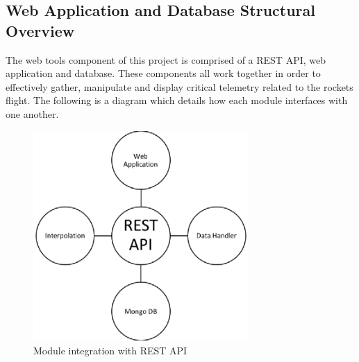 \documentclass[onecolumn, draftclsnofoot,10pt, compsoc]{IEEEtran}
\begin{document}
\subsection{Web Application and Database Structural Overview}
The web tools component of this project is comprised of a REST API, web application and database. These components all work together in order to effectively gather, manipulate and display critical telemetry related to the rockets flight. The following is a diagram which details how each module interfaces with one another.
\begin{figure}[h]
    \centering
        \includegraphics[height=8cm]{module_integration}
        \caption{Module integration with REST API}
        \label{fig:module_integration}
\end{figure}
\end{document}
